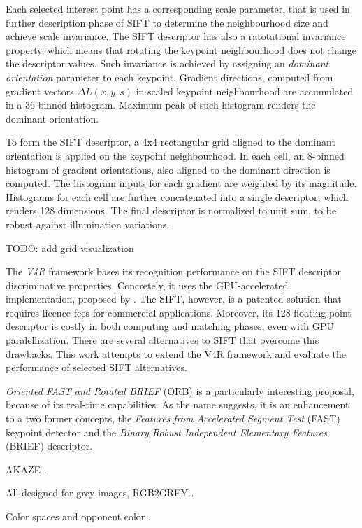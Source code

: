 Each selected interest point has a corresponding scale parameter, that is used in further description phase of SIFT to determine the neighbourhood size and achieve scale invariance. The SIFT descriptor has also a ratotational invariance property, which means that rotating the keypoint neighbourhood does not change the descriptor values. Such invariance is achieved by assigning an \textit{dominant orientation} parameter to each keypoint. Gradient directions, computed from gradient vectors $\Delta L(x,y,s)$ in scaled keypoint neighbourhood are accumulated in a 36-binned histogram. Maximum peak of such histogram renders the dominant orientation.

To form the SIFT descriptor, a 4x4 rectangular grid aligned to the dominant orientation is applied on the keypoint neighbourhood. In each cell, an 8-binned histogram of gradient orientations, also aligned to the dominant direction is computed. The histogram inputs for each gradient are weighted by its magnitude. Histograms for each cell are further concatenated into a single descriptor, which renders 128 dimensions. The final descriptor is normalized to unit sum, to be robust against illumination variations.

TODO: add grid visualization

The \textit{V4R} framework bases its recognition performance on the SIFT descriptor discriminative properties. Concretely, it uses the GPU-accelerated implementation, proposed by \cite{SIFTGPU}. The SIFT, however, is a patented solution \cite{SIFT-PATENT} that requires licence fees for commercial applications. Moreover, its 128 floating point descriptor is costly in both computing and matching phases, even with GPU paralellization. There are several alternatives to SIFT that overcome this drawbacks. This work attempts to extend the V4R framework and evaluate the performance of selected SIFT alternatives.

\textit{Oriented FAST and Rotated BRIEF} (ORB) \cite{ORB} is a particularly interesting proposal, because of its real-time capabilities. As the name suggests, it is an enhancement to a two former concepts, the\textit{ Features from Accelerated Segment Test} (FAST) \cite{FAST} keypoint detector and the \textit{Binary Robust Independent
Elementary Features} (BRIEF) \cite{BRIEF} descriptor.

AKAZE \cite{AKAZE}.

All designed for grey images, RGB2GREY \cite{RGB2GREY}.

Color spaces and opponent color \cite{ColorComparison}.

